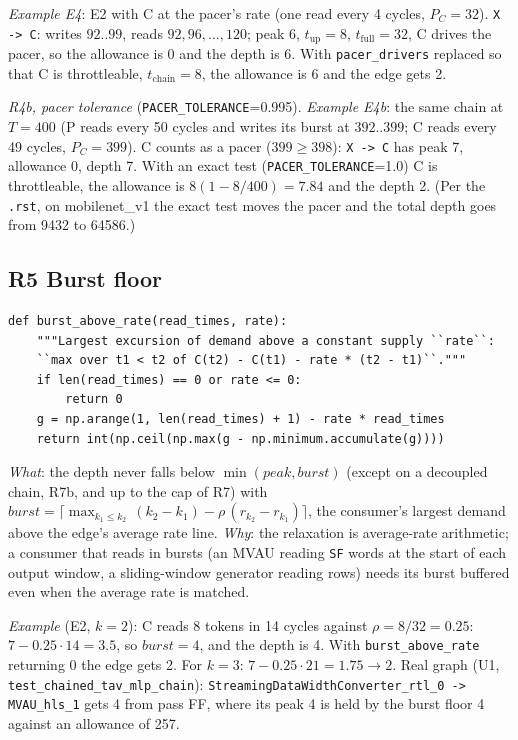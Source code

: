 \documentclass[10pt,a4paper]{article}
\newcommand{\code}[1]{\texttt{#1}}
\newcommand{\Tg}{T}           %
\begin{document}
\emph{Example E4}: E2 with C at the pacer's rate (one read every 4 cycles,
$P_C=32$). \code{X -> C}: writes $92..99$, reads $92,96,\dots,120$; peak 6,
$t_{\mathrm{up}}=8$, $t_{\mathrm{full}}=32$, C drives the pacer, so the allowance is 0
and the depth is 6. With \code{pacer\_drivers} replaced so that C is throttleable,
$t_{\mathrm{chain}}=8$, the allowance is 6 and the edge gets 2.

\emph{R4b, pacer tolerance} (\code{PACER\_TOLERANCE}=0.995). \emph{Example E4b}:
the same chain at $\Tg=400$ (P reads every 50 cycles and writes its burst at
$392..399$; C reads every 49 cycles, $P_C=399$). C counts as a pacer ($399\ge398$):
\code{X -> C} has peak 7, allowance 0, depth 7. With an exact test
(\code{PACER\_TOLERANCE}=1.0) C is throttleable, the allowance is
$8(1-8/400)=7.84$ and the depth 2. (Per the \code{.rst}, on mobilenet\_v1 the exact test moves the pacer and the
total depth goes from 9432 to 64586.)

\subsection{R5 Burst floor}

\begin{lstlisting}[firstnumber=561,title={\texttt{src/finn/transformation/fpgadataflow/derive\_characteristic.py}, lines 561--567}]
def burst_above_rate(read_times, rate):
    """Largest excursion of demand above a constant supply ``rate``:
    ``max over t1 < t2 of C(t2) - C(t1) - rate * (t2 - t1)``."""
    if len(read_times) == 0 or rate <= 0:
        return 0
    g = np.arange(1, len(read_times) + 1) - rate * read_times
    return int(np.ceil(np.max(g - np.minimum.accumulate(g))))
\end{lstlisting}

\emph{What}: the depth never falls below $\min(\mathit{peak}, \mathit{burst})$ (except
on a decoupled chain, R7b, and up to the cap of R7) with
$\mathit{burst}=\lceil\max_{k_1\le k_2}\,(k_2-k_1)-\rho\,(r_{k_2}-r_{k_1})\rceil$, the
consumer's largest demand above the edge's average rate line. \emph{Why}: the
relaxation is average-rate arithmetic; a consumer that reads in bursts (an MVAU
reading \code{SF} words at the start of each output window, a sliding-window
generator reading rows) needs its burst buffered even when the average rate is
matched.

\emph{Example} (E2, $k=2$): C reads 8 tokens in 14 cycles against
$\rho=8/32=0.25$: $7-0.25\cdot14=3.5$, so $\mathit{burst}=4$, and the depth is 4. With
\code{burst\_above\_rate} returning 0 the edge gets 2. For $k=3$:
$7-0.25\cdot21=1.75\to2$. Real graph (U1, \code{test\_chained\_tav\_mlp\_chain}):
\code{StreamingDataWidthConverter\_rtl\_0 -> MVAU\_hls\_1} gets 4 from pass FF, where its
peak 4 is held by the burst floor 4 against an allowance of 257.
\end{document}
